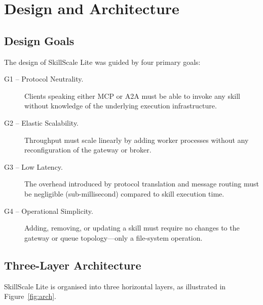 \documentclass[sigconf,nonacm]{acmart}
\begin{document}
\section{Design and Architecture}
\label{sec:design}

\subsection{Design Goals}

The design of SkillScale Lite was guided by four primary goals:

\begin{description}
  \item[G1 -- Protocol Neutrality.] Clients speaking either MCP or A2A must be able to invoke any skill without knowledge of the underlying execution infrastructure.
  \item[G2 -- Elastic Scalability.] Throughput must scale linearly by adding worker processes without any reconfiguration of the gateway or broker.
  \item[G3 -- Low Latency.] The overhead introduced by protocol translation and message routing must be negligible (sub-millisecond) compared to skill execution time.
  \item[G4 -- Operational Simplicity.] Adding, removing, or updating a skill must require no changes to the gateway or queue topology---only a file-system operation.
\end{description}

\subsection{Three-Layer Architecture}

SkillScale Lite is organised into three horizontal layers, as illustrated in Figure~\ref{fig:arch}.
\end{document}
